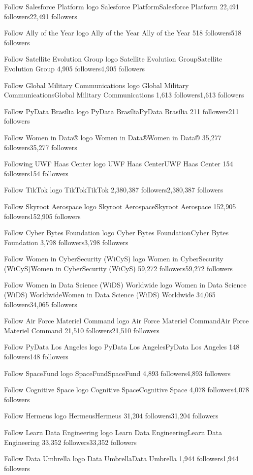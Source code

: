 Follow
Salesforce Platform logo
Salesforce PlatformSalesforce Platform
22,491 followers22,491 followers

Follow
Ally of the Year  logo
Ally of the Year Ally of the Year 
518 followers518 followers

Follow
Satellite Evolution Group logo
Satellite Evolution GroupSatellite Evolution Group
4,905 followers4,905 followers

Follow
Global Military Communications logo
Global Military CommunicationsGlobal Military Communications
1,613 followers1,613 followers

Follow
PyData Brasília logo
PyData BrasíliaPyData Brasília
211 followers211 followers

Follow
Women in Data® logo
Women in Data®Women in Data®
35,277 followers35,277 followers

Following
UWF Haas Center logo
UWF Haas CenterUWF Haas Center
154 followers154 followers

Follow
TikTok logo
TikTokTikTok
2,380,387 followers2,380,387 followers

Follow
Skyroot Aerospace logo
Skyroot AerospaceSkyroot Aerospace
152,905 followers152,905 followers

Follow
Cyber Bytes Foundation logo
Cyber Bytes FoundationCyber Bytes Foundation
3,798 followers3,798 followers

Follow
Women in CyberSecurity (WiCyS) logo
Women in CyberSecurity (WiCyS)Women in CyberSecurity (WiCyS)
59,272 followers59,272 followers

Follow
Women in Data Science (WiDS) Worldwide logo
Women in Data Science (WiDS) WorldwideWomen in Data Science (WiDS) Worldwide
34,065 followers34,065 followers

Follow
Air Force Materiel Command logo
Air Force Materiel CommandAir Force Materiel Command
21,510 followers21,510 followers

Follow
PyData Los Angeles logo
PyData Los AngelesPyData Los Angeles
148 followers148 followers

Follow
SpaceFund logo
SpaceFundSpaceFund
4,893 followers4,893 followers

Follow
Cognitive Space logo
Cognitive SpaceCognitive Space
4,078 followers4,078 followers

Follow
Hermeus logo
HermeusHermeus
31,204 followers31,204 followers

Follow
Learn Data Engineering logo
Learn Data EngineeringLearn Data Engineering
33,352 followers33,352 followers

Follow
Data Umbrella logo
Data UmbrellaData Umbrella
1,944 followers1,944 followers


